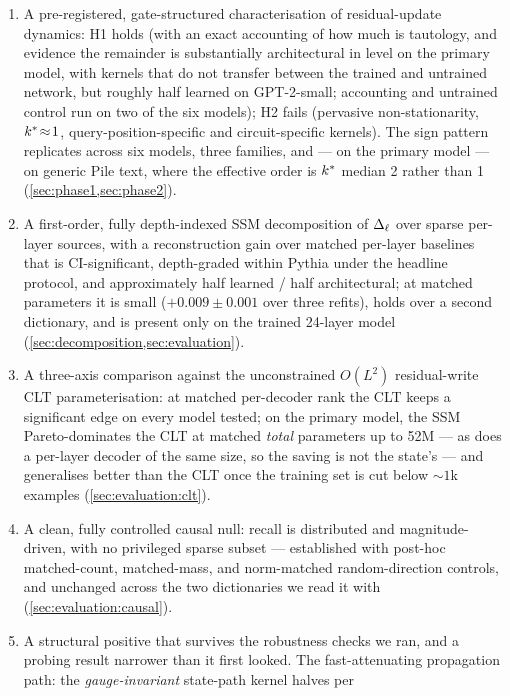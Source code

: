 \begin{enumerate}
  \item A pre-registered, gate-structured characterisation of residual-update
    dynamics: H1 holds (with an exact accounting of how much is tautology,
    and evidence the remainder is substantially architectural in level on the
    primary model, with kernels that do not transfer between the trained and
    untrained network, but roughly half learned on GPT-2-small; accounting and
    untrained control run on two of the six models); H2 fails
    (pervasive non-stationarity, $k^{\ast}\!\approx\!1$, query-position-specific
    and circuit-specific kernels). The sign pattern replicates across six
    models, three families, and --- on the primary model --- on generic Pile
    text, where the effective
    order is $k^{\ast}$ median 2 rather than 1
    (\cref{sec:phase1,sec:phase2}).
  \item A first-order, fully depth-indexed SSM decomposition of $\Delta_\ell$ over
    sparse per-layer sources, with a reconstruction gain over matched
    per-layer baselines that is CI-significant, depth-graded within Pythia
    under the headline protocol, and approximately half learned / half
    architectural; at matched parameters it is small ($+0.009 \pm 0.001$
    over three refits), holds over a second dictionary, and is present only
    on the trained 24-layer model
    (\cref{sec:decomposition,sec:evaluation}).
  \item A three-axis comparison against the unconstrained $O(L^2)$
    residual-write CLT parameterisation: at matched per-decoder rank the CLT
    keeps a significant edge on every model tested; on the primary model, the
    SSM Pareto-dominates the CLT at matched \emph{total} parameters up to 52M
    --- as does a per-layer decoder of the same size, so the saving is not
    the state's --- and generalises better than the CLT once the training set
    is cut below ${\sim}1$k examples (\cref{sec:evaluation:clt}).
  \item A clean, fully controlled causal null: recall is distributed and
    magnitude-driven, with no privileged sparse subset --- established with
    post-hoc matched-count, matched-mass, and norm-matched random-direction
    controls, and unchanged across the two dictionaries we read it with
    (\cref{sec:evaluation:causal}).
  \item A structural positive that survives the robustness checks we ran, and
    a probing result narrower than it first looked. The fast-attenuating
    propagation path: the \emph{gauge-invariant} state-path kernel halves per

\end{enumerate}
